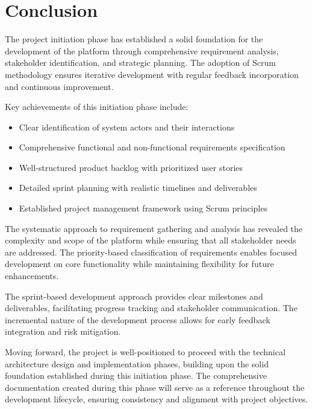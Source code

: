     

\section{Conclusion}

The project initiation phase has established a solid foundation for the development of the platform through comprehensive requirement analysis, stakeholder identification, and strategic planning. The adoption of Scrum methodology ensures iterative development with regular feedback incorporation and continuous improvement.

Key achievements of this initiation phase include:
\begin{itemize}
    \item Clear identification of system actors and their interactions
    \item Comprehensive functional and non-functional requirements specification
    \item Well-structured product backlog with prioritized user stories
    \item Detailed sprint planning with realistic timelines and deliverables
    \item Established project management framework using Scrum principles
\end{itemize}

The systematic approach to requirement gathering and analysis has revealed the complexity and scope of the platform while ensuring that all stakeholder needs are addressed. The priority-based classification of requirements enables focused development on core functionality while maintaining flexibility for future enhancements.

The sprint-based development approach provides clear milestones and deliverables, facilitating progress tracking and stakeholder communication. The incremental nature of the development process allows for early feedback integration and risk mitigation.

Moving forward, the project is well-positioned to proceed with the technical architecture design and implementation phases, building upon the solid foundation established during this initiation phase. The comprehensive documentation created during this phase will serve as a reference throughout the development lifecycle, ensuring consistency and alignment with project objectives.